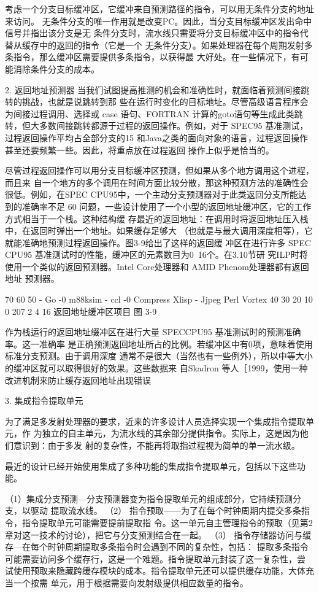 考虑一个分支目标缓冲区，它缓冲来自预测路径的指令，可以用无条件分支的地址来访问。
无条件分支的唯一作用就是改变PC。因此，当分支目标缓冲区发出命中信号并指出该分支是无
条件分支时，流水线只需要将分支目标缓冲区中的指令代替从缓存中的返回的指令（它是一个
无条件分支）。如果处理器在每个周期发射多条指令，那么缓冲区需要提供多条指令，以获得最
大好处。在一些情况下，有可能消除条件分支的成本。

2. 返回地址预测器
当我们试图提高推测的机会和准确性时，就面临着预测间接跳转的挑战，也就是说跳转到那
些在运行时变化的目标地址。尽管高级语言程序会为间接过程调用、选择或 case 语句、FORTRAN
计算的goto语句等生成此类跳转，但大多数间接跳转都源于过程的返回操作。例如，对于 SPEC95
基准测试，过程返回操作平均占全部分支的15%
和Java之类的面向对象的语言，过程返回操作甚至还要频繁一些。因此，将重点放在过程返回
操作上似乎是恰当的。

尽管过程返回操作可以用分支目标缓冲区预测，但如果从多个地方调用这个进程，而且来
自一个地方的多个调用在时间方面比较分散，那这种预测方法的准确性会很低。例如，在SPEC
CPU95中，一个主动分支预测器对于此类返回分支所能达到的准确率不足 60%
问题，一些设计使用了一个小型的返回地址缓冲区，它的工作方式相当于一个栈。这种结构缓
存最近的返回地址：在调用时将返回地址压入栈中，在返回时弹出一个地址。如果缓存足够大
（也就是与最大调用深度相等），它就能准确地预测过程返回操作。图3-9给出了这样的返回缓
冲区在进行许多 SPEC CPU95 基准测试时的性能，缓冲区的元素数目为0~16个。在3.10节研
究ILP时将使用一个类似的返回预测器。Intel Core处理器和 AMID Phenom处理器都有返回地址
预测器。

70%
60%
50%
- Go
-0 m88ksim
- ccl
-0 Compress
Xlisp
- Jjpeg
Perl
 Vortex
40%
30%
20%
10%
0%
207
2
4
16
返回地址缓冲区项目
图 3-9

作为栈运行的返回地址缀冲区在进行大量 SPECCPU95 基准测试时的预测准确率。这一准确率
是正确预测返回地址所占的比例。若缓冲区中有0项，意味着使用标准分支预测。由于调用深度
通常不是很大（当然也有一些例外），所以中等大小的缓冲区就可以取得很好的效果。这些数据来
自Skadron 等人［1999，使用一种改进机制来防止缓存返回地址出现错误

3. 集成指令提取单元

为了满足多发射处理器的要求，近来的许多设计人员选择实现一个集成指令提取单元，作
为独立的自主单元，为流水线的其余部分提供指令。实际上，这是因为他们意识到：由于多发
射的复杂性，不能再将取指过程视为简单的单一流水级。

最近的设计已经开始使用集成了多种功能的集成指令提取单元，包括以下这些功能。

（1）集成分支预测—分支预测器变为指令提取单元的组成部分，它持续预测分支，以驱动
提取流水线。
（2） 指令预取——为了在每个时钟周期内提交多条指令，指令提取单元可能需要提前提取指
令。这一单元自主管理指令的预取（见第2章对这一技术的讨论），把它与分支预测结合在一起。
（3） 指令存储器访问与缓存—在每个时钟周期提取多条指令时会遇到不同的复杂性，包括：
提取多条指令可能需要访问多个缓存行，这是一个难题。指令提取单元封装了这一复杂性，尝
试使用预取来隐藏跨缓存模块的成本。指令提取单元还可以提供缓存功能，大体充当一个按需
单元，用于根据需要向发射级提供相应数量的指令。

